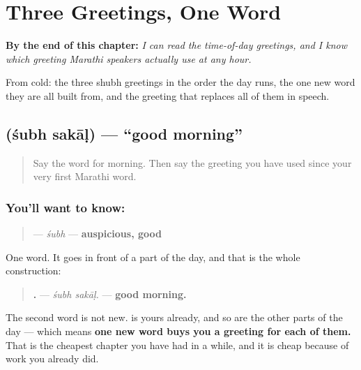 
\chapter{Three Greetings, One Word}
\label{ch:mr-shubh}

\begin{chapteropening}
\textbf{By the end of this chapter:} \emph{I can read the time-of-day greetings, and I know which greeting Marathi speakers actually use at any hour.}

From cold: the three shubh greetings in the order the day runs, the one new word they are all built from, and the greeting that replaces all of them in speech.
\end{chapteropening}

\section[\texorpdfstring{\mr{शुभ} \mr{सकाळ} (śubh sakāḷ)}{शुभ सकाळ (śubh sakāḷ)}]{  (śubh sakāḷ) — \textquotedblleft{}good morning\textquotedblright{}}

\label{lesson:MR-C68-shubh-sakal}



\begin{quote}
Say the word for morning. Then say the greeting you have used since your very first Marathi word.
\end{quote}

\subsection*{You'll want to know: }
\begin{quote}
\textbf{} — \emph{śubh} — \textbf{auspicious, good}
\end{quote}

One word. It goes in front of a part of the day, and that is the whole construction:

\begin{quote}
\textbf{ .} — \emph{śubh sakāḷ.} — \textbf{good morning.}
\end{quote}

The second word is not new. \textbf{} is yours already, and so are the other parts of the day — which means \textbf{one new word buys you a greeting for each of them.} That is the cheapest chapter you have had in a while, and it is cheap because of work you already did.

